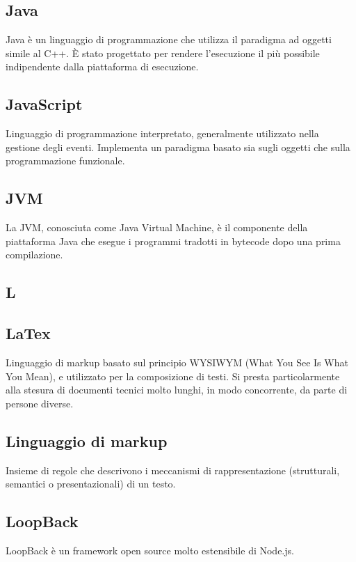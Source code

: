 \subsection*{Java}
Java è un linguaggio di programmazione che utilizza il paradigma ad oggetti simile al C++. È stato
progettato per rendere l'esecuzione il più possibile indipendente dalla piattaforma di
esecuzione.

\subsection*{JavaScript}
Linguaggio di programmazione interpretato, generalmente utilizzato nella gestione
degli eventi. Implementa un paradigma basato sia sugli oggetti che sulla programmazione
funzionale.

\subsection*{JVM}
La JVM, conosciuta come Java Virtual Machine, è il componente della piattaforma Java che esegue i programmi tradotti in bytecode dopo una prima compilazione.

\newpage

\begin{center}
\Huge\section*{\uppercase{L}}
\end{center}

\subsection*{LaTex}
Linguaggio di markup basato sul principio WYSIWYM (What You See Is What You
Mean), e utilizzato per la composizione di testi. Si presta particolarmente alla stesura di
documenti tecnici molto lunghi, in modo concorrente, da parte di persone diverse.

\subsection*{Linguaggio di markup}
Insieme di regole che descrivono i meccanismi di rappresentazione (strutturali, semantici o presentazionali) di un testo.

\subsection*{LoopBack}
LoopBack è un framework open source molto estensibile di Node.js. 

